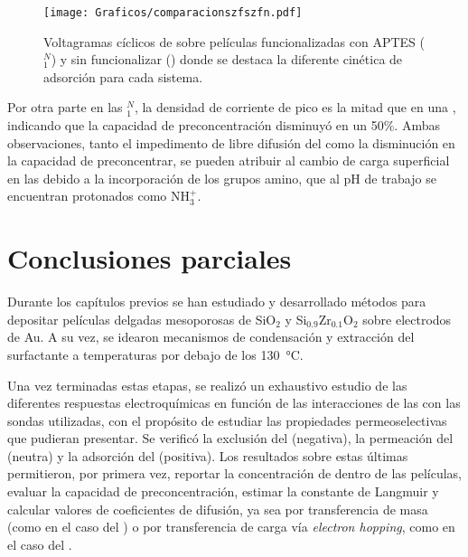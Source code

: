 	 	 		 \begin{figure}[h!]	
					\centering
			 	    \texttt{[image: Graficos/comparacionszfszfn.pdf]}
			        \caption[Evolución de la señal de \ru\space para distintos sistemas]{Voltagramas cíclicos de \ru\space sobre películas funcionalizadas con APTES (\pdmZ$^N_1$) y sin funcionalizar (\pdmZ) donde se destaca la diferente cinética de adsorción para cada sistema.}
			        \vspace*{4mm}
			        \label{fig:compaptesnoaptes}
			      	\end{figure}


	 	 Por otra parte en las \pdmZ$^N_1$, la densidad de corriente de pico es la mitad que en una \pdmZ, indicando que la capacidad de preconcentración disminuyó en un 50\%. Ambas observaciones, tanto el impedimento de libre difusión del \ru\space como la disminución en la capacidad de preconcentrar, se pueden atribuir al cambio de carga superficial en las \pdmZ\space debido a la incorporación de los grupos amino, que al pH de trabajo se encuentran protonados como NH$_3^+$.\cite{calvo2010a}

\section{Conclusiones parciales}
	
	Durante los capítulos previos se han estudiado y desarrollado métodos para depositar películas delgadas mesoporosas de SiO$_2$ y Si$_{0.9}$Zr$_{0.1}$O$_2$  sobre electrodos de Au. A su vez, se idearon mecanismos de condensación y extracción del surfactante a temperaturas por debajo de los \SI{130}{\celsius}. 

	Una vez terminadas estas etapas, se realizó un exhaustivo estudio de las diferentes respuestas electroquímicas en función de las interacciones de las \pdm\space con las sondas utilizadas, con el propósito de estudiar las propiedades permeoselectivas que pudieran presentar. Se verificó la exclusión del \ferroferri\space (negativa), la permeación del \fc\space (neutra) y la adsorción del \aminorutenio\space (positiva). Los resultados sobre estas últimas permitieron, por primera vez, reportar la concentración de \ru\space dentro de las películas, evaluar la capacidad de preconcentración, estimar la constante de Langmuir y calcular valores de coeficientes de difusión, ya sea por transferencia de masa (como en el caso del \fc) o por transferencia de carga vía \textit{electron hopping}, como en el caso del \ru.

